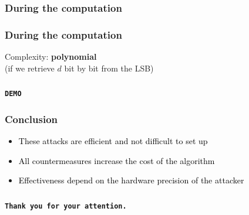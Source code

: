 \documentclass{beamer}
\begin{document}
    \begin{frame}
        \frametitle{During the computation}
        
        \begin{algorithm}[H]
            \small


        \end{algorithm}

    \end{frame}


    \begin{frame}
        \frametitle{During the computation}
        Complexity: {\bf polynomial}\\

        (if we retrieve $d$ bit by bit from the LSB)

    \end{frame}

    \begin{frame}
        \frametitle{}
        \begin{center}
            {\Huge\bf\tt DEMO}
        \end{center}
    \end{frame}

\begin{frame}
    \frametitle{Conclusion}

    \begin{itemize}
        \item \textcolor{black}{These attacks are efficient and not difficult to set up}
        \item \textcolor{black}{All countermeasures increase the cost of the algorithm}
	\item \textcolor{black}{Effectiveness depend on the hardware precision of the attacker}
    \end{itemize}

\end{frame}


\begin{frame}
    \frametitle{}
    \begin{center}
        {\Huge\bf\tt Thank you for your attention.}
    \end{center}
\end{frame}
\end{document}
